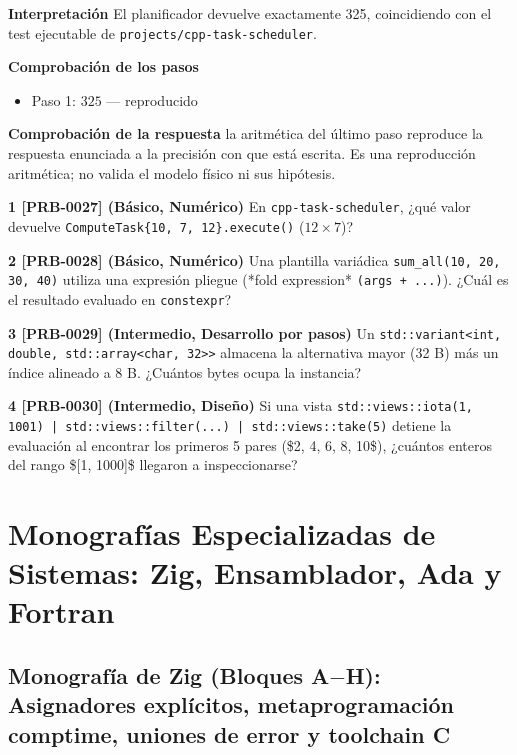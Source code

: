 \documentclass{book}
\begin{document}
\begin{tcolorbox}[title={Problema resuelto}, studiumworked, breakable]
\noindent\textbf{Interpretación}
El planificador devuelve exactamente 325, coincidiendo con el test ejecutable de \texttt{projects/cpp-task-scheduler}.

\noindent\textbf{Comprobación de los pasos}
\begin{itemize}
\item Paso 1: $325$ — reproducido
\end{itemize}

\noindent\textbf{Comprobación de la respuesta} la aritmética del último paso reproduce la respuesta enunciada a la precisión con que está escrita. Es una reproducción aritmética; no valida el modelo físico ni sus hipótesis.
\end{tcolorbox}

\begin{tcolorbox}[title={Ejercicios}, studiumworked, breakable]

\noindent\textbf{1 [PRB-0027] (Básico, Numérico)}
En \texttt{cpp-task-scheduler}, ¿qué valor devuelve \texttt{ComputeTask\{10, 7, 12\}.execute()} (\(12 \times 7\))?

\noindent\textbf{2 [PRB-0028] (Básico, Numérico)}
Una plantilla variádica \texttt{sum\_all(10, 20, 30, 40)} utiliza una expresión pliegue (*fold expression* \texttt{(args + ...)}). ¿Cuál es el resultado evaluado en \texttt{constexpr}?

\noindent\textbf{3 [PRB-0029] (Intermedio, Desarrollo por pasos)}
Un \texttt{std::variant<int, double, std::array<char, 32>>} almacena la alternativa mayor (32 B) más un índice alineado a 8 B. ¿Cuántos bytes ocupa la instancia?

\noindent\textbf{4 [PRB-0030] (Intermedio, Diseño)}
Si una vista \texttt{std::views::iota(1, 1001) | std::views::filter(...) | std::views::take(5)} detiene la evaluación al encontrar los primeros 5 pares (\$2, 4, 6, 8, 10\$), ¿cuántos enteros del rango \$[1, 1000]\$ llegaron a inspeccionarse?
\end{tcolorbox}

\part{Monografías Especializadas de Sistemas: Zig, Ensamblador, Ada y Fortran}

\chapter{Monografía de Zig (Bloques A\(-\)H): Asignadores explícitos, metaprogramación comptime, uniones de error y toolchain C}
\label{chap:cap06-monografia-zig-asignadores-comptime-interoperabilidad-c}
\end{document}
